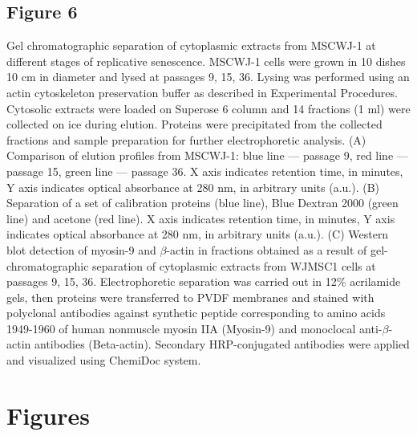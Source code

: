 \documentclass[alpha-refs]{wiley-article}
\begin{document}
\subsection*{Figure 6}
Gel chromatographic separation of cytoplasmic extracts from MSCWJ-1 at different stages of replicative senescence.
MSCWJ-1 cells were grown in 10 dishes 10 cm in diameter and lysed at passages  9, 15, 36.
Lysing was performed using an actin cytoskeleton preservation buffer as described in Experimental Procedures.
Cytosolic extracts were loaded on Superose 6 column and 14 fractions (1 ml) were collected on ice during elution.
Proteins were precipitated from the collected fractions and sample preparation for further electrophoretic analysis.
(A) Comparison of elution profiles from MSCWJ-1: blue line --- passage 9, red line --- passage 15, green line --- passage 36.
X axis indicates retention time, in minutes, Y axis indicates optical absorbance at 280 nm, in arbitrary units (a.u.).
(B) Separation of a set of calibration proteins (blue line), Blue Dextran 2000 (green line) and acetone (red line).
X axis indicates retention time, in minutes, Y axis indicates optical absorbance at 280 nm, in arbitrary units (a.u.).
(C) Western blot detection of myosin-9 and $\beta$-actin in fractions obtained as a result of gel-chromatographic separation of cytoplasmic extracts from WJMSC1 cells at passages 9, 15, 36.
Electrophoretic separation was carried out in 12\% acrilamide gels, then proteins were transferred to PVDF membranes and stained with polyclonal antibodies against synthetic peptide corresponding to amino acids 1949-1960 of human nonmuscle myosin IIA (Myosin-9) and monoclocal anti-$\beta$-actin antibodies (Beta-actin).
Secondary HRP-conjugated antibodies were applied and visualized using ChemiDoc system.


\section*{Figures}
\end{document}
